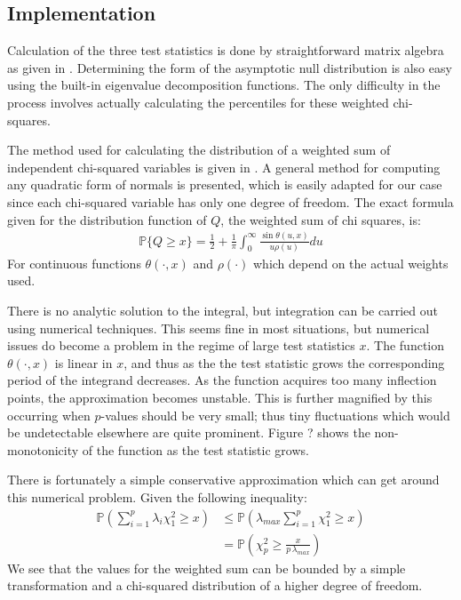 \documentclass[article]{jss}
\begin{document}
\subsection{Implementation}

Calculation of the three test statistics is done by straightforward matrix algebra as given in \cite{choulakian1994}. Determining 
the form of the asymptotic null distribution is also easy using the built-in eigenvalue decomposition functions. The only 
difficulty in the process involves actually calculating the percentiles for these weighted chi-squares. 

The method used for calculating the distribution of a weighted sum of independent chi-squared variables is given in \cite{imhof1961}.
A general method for computing any quadratic form of normals is presented, which is easily adapted for our case since
each chi-squared variable has only one degree of freedom. The exact formula given for the distribution function of $Q$, the weighted
sum of chi squares, is:
\begin{align*}
\mathbb{P}\{Q \geq x \} = \frac{1}{2} + \frac{1}{\pi} \int_{0}^{\infty} \frac{\sin\theta(u,x)}{u \rho(u) } du
\end{align*}
For continuous functions $\theta(\cdot, x)$ and $\rho(\cdot)$ which depend on the actual weights used. 

There is no analytic solution to the integral, but integration can be carried out using numerical techniques. This seems
fine in most situations, but numerical issues do become a problem in the regime of large test statistics $x$. The function
$\theta(\cdot, x)$ is linear in $x$, and thus as the the test statistic grows the corresponding period of the integrand 
decreases. As the function acquires too many inflection points, the approximation becomes unstable. This is further
magnified by this occurring when $p$-values should be very small; thus tiny fluctuations which would be undetectable
elsewhere are quite prominent. Figure ? shows the non-monotonicity of the function as the test statistic grows.

There is fortunately a simple conservative approximation which can get around this numerical problem. Given the
following inequality:
\begin{align*}
\mathbb{P} \left(\sum_{i=1}^{p} \lambda_i \chi^2_1 \geq x \right) &\leq \mathbb{P} \left( \lambda_{max} \sum_{i=1}^{p} \chi^2_1 \geq x \right) \\
&= \mathbb{P} \left(\chi^2_p \geq \frac{x}{p \, \lambda_{max}} \right)
\end{align*}
We see that the values for the weighted sum can be bounded by a simple transformation and a chi-squared distribution
of a higher degree of freedom. 
\end{document}
